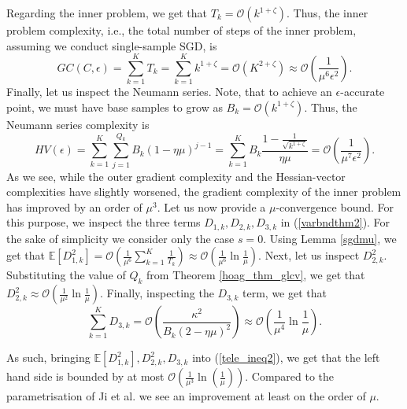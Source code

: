 \documentclass[11pt, twoside]{report}
\begin{document}
Regarding the inner problem, we get that $T_k = \mathcal{O}\left(k^{1+\zeta}\right)$. Thus, the inner problem complexity, i.e., the total number of steps of the inner problem, assuming we conduct single-sample SGD, is
\[GC(C,\epsilon) = \sum_{k=1}^K T_k = \sum_{k=1}^{K} k^{1+\zeta} = \mathcal{O}(K^{2+\zeta}) \approx \mathcal{O} \left(\frac{1}{\mu^6 \epsilon^2}\right).\]
Finally, let us inspect the Neumann series. Note, that to achieve an $\epsilon$-accurate point, we must have base samples to grow as $B_k = \mathcal{O} \left( k^{1+\zeta} \right)$. Thus, the Neumann series complexity is
\[HV(\epsilon) = \sum_{k=1}^K \sum_{j=1}^{Q_k} B_k (1-\eta\mu)^{j-1}=\sum_{k=1}^K B_k \frac{1 - \frac{1}{\sqrt{k^{1+\zeta}}}}{\eta\mu} = \mathcal{O}\left(\frac{1}{\mu^7 \epsilon^2} \right).\]
As we see, while the outer gradient complexity and the Hessian-vector complexities have slightly worsened, the gradient complexity of the inner problem has improved by an order of $\mu^3$. Let us now provide a $\mu$-convergence bound. For this purpose, we inspect the three terms $D_{1,k}, D_{2,k}, D_{3,k}$ in (\ref{varbndthm2}). For the sake of simplicity we consider only the case $s=0$. Using Lemma \ref{sgdmu}, we get that $\mathbb{E} [D_{1,k}^2] = \mathcal{O}\left(\frac{1}{\mu^6}\sum_{k=1}^K\frac{1}{T_k}\right) \approx \mathcal{O}\left(\frac{1}{\mu^6}\ln{\frac{1}{\mu}}\right)$. Next, let us inspect $D_{2,k}^2$. Substituting the value of $Q_k$ from Theorem \ref{hoag_thm_glcv}, we get that $D_{2,k}^2 \approx \mathcal{O} \left( \frac{1}{\mu^2} \ln{\frac{1}{\mu}}\right)$. Finally, inspecting the $D_{3,k}$ term, we get that
\[\sum^{K}_{k=1} D_{3,k} = \mathcal{O}\left( \frac{\kappa^2}{B_k (2 - \eta \mu)^2} \right) \approx \mathcal{O}\left( \frac{1}{\mu^4} \ln{\frac{1}{\mu}} \right).\]

As such, bringing $\mathbb{E} [D_{1,k}^2], D_{2,k}^2, D_{3,k}$ into (\ref{tele_ineq2}), we get that the left hand side is bounded by at most $\mathcal{O}\left( \frac{1}{\mu^3} \ln{\left( \frac{1}{\mu} \right)} \right)$. Compared to the parametrisation of Ji et al. we see an improvement at least on the order of $\mu$.
\end{document}
